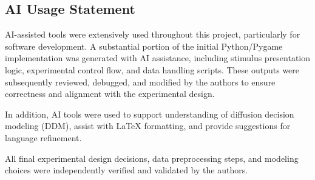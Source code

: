 \documentclass[stu,12pt,floatsintext]{apa7}
\begin{document}
\subsection*{AI Usage Statement}
AI-assisted tools were extensively used throughout this project, particularly for software development. A substantial portion of the initial Python/Pygame implementation was generated with AI assistance, including stimulus presentation logic, experimental control flow, and data handling scripts. These outputs were subsequently reviewed, debugged, and modified by the authors to ensure correctness and alignment with the experimental design.

In addition, AI tools were used to support understanding of diffusion decision modeling (DDM), assist with LaTeX formatting, and provide suggestions for language refinement.

All final experimental design decisions, data preprocessing steps, and modeling choices were independently verified and validated by the authors.
\end{document}
